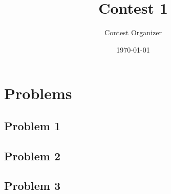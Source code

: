 \documentclass{article}
\title{Contest 1}
\author{Contest Organizer}
\date{\today}
\begin{document}
\maketitle

\section*{Problems}

\subsection*{Problem 1}
% 
\subsection*{Problem 2}

\subsection*{Problem 3}
\end{document}
